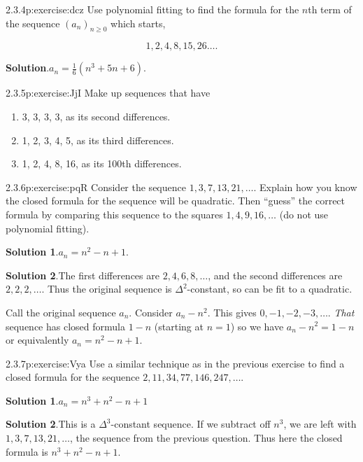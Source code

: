 \documentclass[twoside,11pt,]{book}
\newcommand{\blocktitlefont}{\relax}
\numberwithin{equation}{chapter}
\begin{document}
\begin{divisionsolution}{2.3.4}{}{p:exercise:dcz}%
Use polynomial fitting to find the formula for the \(n\)th term of the sequence \((a_n)_{n \ge 0}\) which starts,%
\par
%
\begin{equation*}
1, 2, 4, 8, 15, 26 \ldots 
\text{.}
\end{equation*}
%
\par\smallskip%
\noindent\textbf{\blocktitlefont Solution}.\quad{}\(a_n = \frac{1}{6} (n^3 + 5n + 6)\text{.}\)%
\end{divisionsolution}%
\begin{divisionsolution}{2.3.5}{}{p:exercise:JjI}%
Make up sequences that have%
\begin{enumerate}[label=(\alph*)]
\item{}3, 3, 3, 3, \textellipsis{} as its second differences.%
\item{}1, 2, 3, 4, 5, \textellipsis{} as its third differences.%
\item{}1, 2, 4, 8, 16, \textellipsis{} as its 100th differences.%
\end{enumerate}
%
\end{divisionsolution}%
\begin{divisionsolution}{2.3.6}{}{p:exercise:pqR}%
Consider the sequence \(1, 3, 7, 13, 21, \ldots\). Explain how you know the closed formula for the sequence will be quadratic. Then ``guess'' the correct formula by comparing this sequence to the squares \(1, 4, 9, 16, \ldots\) (do not use polynomial fitting).%
\par\smallskip%
\noindent\textbf{\blocktitlefont Solution 1}.\quad{}\(a_n = n^2 - n + 1\).%
\par\smallskip%
\noindent\textbf{\blocktitlefont Solution 2}.\quad{}The first differences are \(2, 4, 6, 8, \ldots\), and the second differences are \(2, 2, 2, \ldots\). Thus the original sequence is \(\Delta^2\)-constant, so can be fit to a quadratic.%
\par
Call the original sequence \(a_n\). Consider \(a_n - n^2\). This gives \(0, -1, -2, -3, \ldots\). \emph{That} sequence has closed formula \(1-n\) (starting at \(n = 1\)) so we have \(a_n - n^2 = 1-n\) or equivalently \(a_n = n^2 - n + 1\).%
\end{divisionsolution}%
\begin{divisionsolution}{2.3.7}{}{p:exercise:Vya}%
Use a similar technique as in the previous exercise to find a closed formula for the sequence \(2, 11, 34, 77, 146, 247,\ldots\).%
\par\smallskip%
\noindent\textbf{\blocktitlefont Solution 1}.\quad{}\(a_n = n^3 + n^2 - n + 1\)%
\par\smallskip%
\noindent\textbf{\blocktitlefont Solution 2}.\quad{}This is a \(\Delta^3\)-constant sequence. If we subtract off \(n^3\), we are left with \(1, 3, 7, 13, 21, \ldots\), the sequence from the previous question. Thus here the closed formula is \(n^3 + n^2 - n + 1\).%
\end{divisionsolution}%
\end{document}
